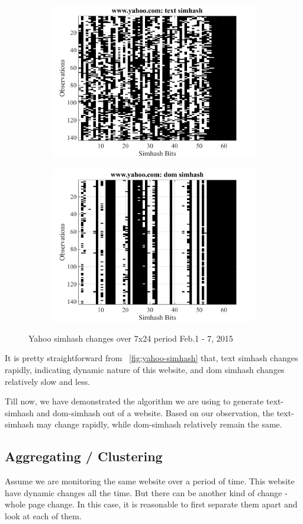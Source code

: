 \begin{figure}[t]
  \centering
  \begin{subfigure}
    \centering
    \includegraphics[width=.5\textwidth]{fig/yahoo-text-user}
    \label{fig:yahoo-text-user}
  \end{subfigure}%
  \begin{subfigure}
    \centering
    \includegraphics[width=.5\textwidth]{fig/yahoo-dom-user}
    \label{fig:yahoo-dom-user}
  \end{subfigure}
  \caption{Yahoo simhash changes over 7x24 period Feb.1 - 7, 2015}
  \label{fig:yahoo-simhash}
\end{figure}





It is pretty straightforward from ~\autoref{fig:yahoo-simhash} that,
text simhash changes rapidly, indicating dynamic nature of this
website, and dom simhash changes relatively slow and less.

Till now, we have demonstrated the algorithm we are using to generate
text-simhash and dom-simhash out of a website. Based on our observation, the
text-simhash may change rapidly, while dom-simhash relatively remain the same.


\subsection{Aggregating / Clustering}
Assume we are monitoring the same website over a period of time. This website
have dynamic changes all the time. But there can be another kind of change -
whole page change. In this case, it is reasonable to first separate them apart
and look at each of them.


